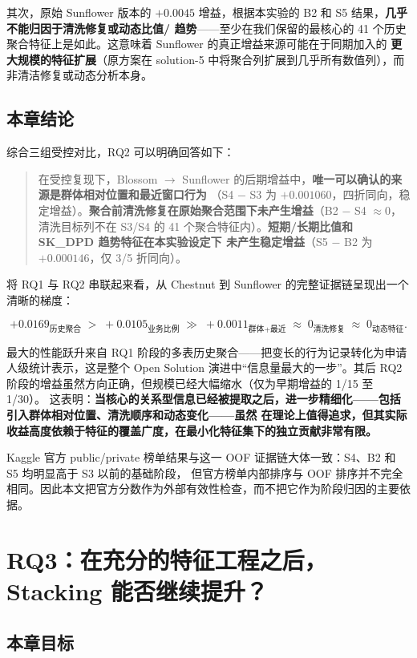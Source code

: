 \documentclass[11pt,UTF8,fontset=windows]{ctexrep}
\begin{document}
其次，原始 Sunflower 版本的 $+0.0045$ 增益，根据本实验的 B2 和 S5 结果，\textbf{几乎不能归因于清洗修复或动态比值/
趋势}——至少在我们保留的最核心的 41 个历史聚合特征上是如此。这意味着 Sunflower 的真正增益来源可能在于同期加入的
\textbf{更大规模的特征扩展}（原方案在 solution-5 中将聚合列扩展到几乎所有数值列），而非清洁修复或动态分析本身。

\section{本章结论}

综合三组受控对比，RQ2 可以明确回答如下：

\begin{quote}
在受控复现下，Blossom $\to$ Sunflower 的后期增益中，\textbf{唯一可以确认的来源是群体相对位置和最近窗口行为}
（S4 $-$ S3 为 $+0.001060$，四折同向，稳定增益）。\textbf{聚合前清洗修复在原始聚合范围下未产生增益}（B2 $-$ S4
$\approx 0$，清洗目标列不在 S3/S4 的 41 个聚合特征内）。\textbf{短期/长期比值和 SK\_DPD 趋势特征在本实验设定下
未产生稳定增益}（S5 $-$ B2 为 $+0.000146$，仅 3/5 折同向）。
\end{quote}

将 RQ1 与 RQ2 串联起来看，从 Chestnut 到 Sunflower 的完整证据链呈现出一个清晰的梯度：

\[
+0.0169_{\text{历史聚合}} \;>\; +0.0105_{\text{业务比例}} \;\gg\; +0.0011_{\text{群体+最近}} \;\approx\; 0_{\text{清洗修复}} \;\approx\; 0_{\text{动态特征}}.
\]

最大的性能跃升来自 RQ1 阶段的多表历史聚合——把变长的行为记录转化为申请人级统计表示，这是整个 Open Solution
演进中“信息量最大的一步”。其后 RQ2 阶段的增益虽然方向正确，但规模已经大幅缩水（仅为早期增益的 1/15 至 1/30）。
这表明：\textbf{当核心的关系型信息已经被提取之后，进一步精细化——包括引入群体相对位置、清洗顺序和动态变化——虽然
在理论上值得追求，但其实际收益高度依赖于特征的覆盖广度，在最小化特征集下的独立贡献非常有限。}

Kaggle 官方 public/private 榜单结果与这一 OOF 证据链大体一致：S4、B2 和 S5 均明显高于 S3 以前的基础阶段，
但官方榜单内部排序与 OOF 排序并不完全相同。因此本文把官方分数作为外部有效性检查，而不把它作为阶段归因的主要依据。

\chapter{RQ3：在充分的特征工程之后，Stacking 能否继续提升？}
\label{chap:rq3}

\section{本章目标}
\end{document}

